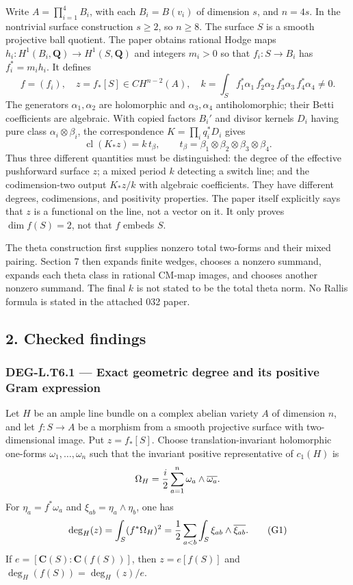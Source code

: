 \documentclass[11pt,a4paper]{article}
\theoremstyle{definition}
\begin{document}
Write \(A=\prod_{i=1}^4B_i\), with each \(B_i=B(v_i)\) of dimension \(s\), and \(n=4s\). In the nontrivial surface construction \(s\ge2\), so \(n\ge8\). The surface \(S\) is a smooth projective ball quotient. The paper obtains rational Hodge maps \(h_i:H^1(B_i,\mathbf Q)\to H^1(S,\mathbf Q)\) and integers \(m_i>0\) so that \(f_i:S\to B_i\) has \(f_i^*=m_i h_i\). It defines \[
f=(f_i),\quad z=f_*[S]\in CH^{n-2}(A),\quad
k=\int_S f_1^*\alpha_1\,f_2^*\alpha_2\,f_3^*\alpha_3\,f_4^*\alpha_4\ne0.
\] The generators \(\alpha_1,\alpha_2\) are holomorphic and \(\alpha_3,\alpha_4\) antiholomorphic; their Betti coefficients are algebraic. With copied factors \(B_i'\) and divisor kernels \(D_i\) having pure class \(\alpha_i\otimes\beta_i\), the correspondence \(K=\prod_i q_i^*D_i\) gives \[
\operatorname{cl}(K_*z)=k\,t_\beta,
\qquad t_\beta=\beta_1\otimes\beta_2\otimes\beta_3\otimes\beta_4.
\] Thus three different quantities must be distinguished: the degree of the effective pushforward surface \(z\); a mixed period \(k\) detecting a switch line; and the codimension-two output \(K_*z/k\) with algebraic coefficients. They have different degrees, codimensions, and positivity properties. The paper itself explicitly says that \(z\) is a functional on the line, not a vector on it. It only proves \(\dim f(S)=2\), not that \(f\) embeds \(S\).

The theta construction first supplies nonzero total two-forms and their mixed pairing. Section 7 then expands finite wedges, chooses a nonzero summand, expands each theta class in rational CM-map images, and chooses another nonzero summand. The final \(k\) is not stated to be the total theta norm. No Rallis formula is stated in the attached 032 paper.

\subsection{2. Checked findings}\label{checked-findings}

\subsubsection{DEG-L.T6.1 --- Exact geometric degree and its positive Gram expression}\label{DEG-L.T6.1}

Let \(H\) be an ample line bundle on a complex abelian variety \(A\) of dimension \(n\), and let \(f:S\to A\) be a morphism from a smooth projective surface with two-dimensional image. Put \(z=f_*[S]\). Choose translation-invariant holomorphic one-forms \(\omega_1,\ldots,\omega_n\) such that the invariant positive representative of \(c_1(H)\) is \[
\Omega_H={i\over2}\sum_{a=1}^n\omega_a\wedge\overline{\omega_a}.
\] For \(\eta_a=f^*\omega_a\) and \(\xi_{ab}=\eta_a\wedge\eta_b\), one has \[
\deg_H(z)=\int_S(f^*\Omega_H)^2
={1\over2}\sum_{a<b}\int_S\xi_{ab}\wedge\overline{\xi_{ab}}.
\tag{G1}
\] If \(e=[\mathbf C(S):\mathbf C(f(S))]\), then \(z=e[f(S)]\) and \(\deg_H(f(S))=\deg_H(z)/e\).
\end{document}
